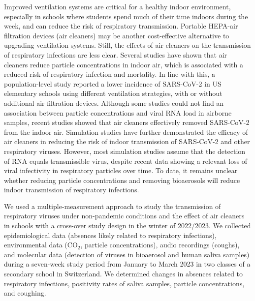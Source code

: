 \documentclass[fleqn,11pt]{wlscirep}
\begin{document}
Improved ventilation systems are critical for a healthy indoor environment, especially in schools where students spend much of their time indoors during the week, and can reduce the risk of respiratory transmission\cite{Wang2021,Morawska2021}. Portable HEPA-air filtration devices (air cleaners) may be another cost-effective alternative to upgrading ventilation systems. Still, the effects of air cleaners on the transmission of respiratory infections are less clear. Several studies have shown that air cleaners reduce particle concentrations in indoor air\cite{Park2020Build,Buising2022InfContr,Banholzer2023PLoSMed}, which is associated with a reduced risk of respiratory infection and mortality\cite{Gordon2014Resp,Kelly2023Atmos,DeAngelis2021EnvRes}. In line with this, a population-level study reported a lower incidence of SARS-CoV-2 in US elementary schools using different ventilation strategies, with or without additional air filtration devices\cite{Gettings2021}. Although some studies could not find an association between particle concentrations and viral RNA load in airborne samples\cite{Nor2021SciRep,Hanna2023PONE}, recent studies showed that air cleaners effectively removed SARS-CoV-2 from the indoor air\cite{Morris2022,Ueki2022mSphere,Myers2022IndoorAir,Rodriguez2021SOTE}. Simulation studies have further demonstrated the efficacy of air cleaners in reducing the risk of indoor transmission of SARS-CoV-2\cite{Lindsley2021} and other respiratory viruses\cite{Cortellessa2023Build}. However, most simulation studies assume that the detection of RNA equals transmissible virus, despite recent data showing a relevant loss of viral infectivity in respiratory particles over time\cite{Oswin2022PNAS}. To date, it remains unclear whether reducing particle concentrations and removing bioaerosols will reduce indoor transmission of respiratory infections. 

We used a multiple-measurement approach to study the transmission of respiratory viruses under non-pandemic conditions and the effect of air cleaners in schools with a cross-over study design in the winter of 2022/2023. We collected epidemiological data (absences likely related to respiratory infections), environmental data (CO$_2$, particle concentrations), audio recordings (coughs), and molecular data (detection of viruses in bioaerosol and human saliva samples) during a seven-week study period from January to March 2023 in two classes of a secondary school in Switzerland. We determined changes in absences related to respiratory infections, positivity rates of saliva samples, particle concentrations, and coughing.
\end{document}
